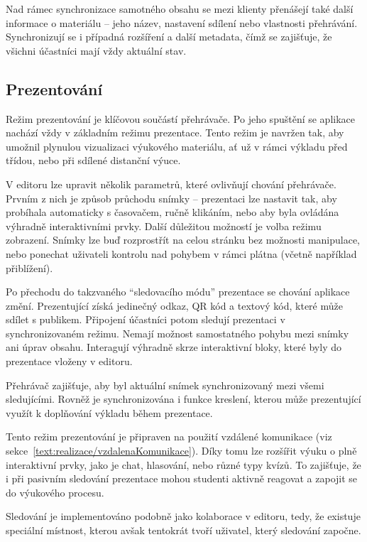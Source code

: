 Nad rámec synchronizace samotného obsahu se mezi klienty přenášejí také další informace o materiálu -- jeho název, nastavení sdílení nebo vlastnosti přehrávání.
Synchronizují se i případná rozšíření a další metadata, čímž se zajišťuje, že všichni účastníci mají vždy aktuální stav.

\subsection{Prezentování}


Režim prezentování je klíčovou součástí přehrávače. 
Po jeho spuštění se aplikace nachází vždy v základním režimu prezentace. 
Tento režim je navržen tak, aby umožnil plynulou vizualizaci výukového materiálu, ať už v rámci výkladu před třídou, nebo při sdílené distanční výuce.

V editoru lze upravit několik parametrů, které ovlivňují chování přehrávače.
Prvním z nich je způsob průchodu snímky -- prezentaci lze nastavit tak, aby probíhala automaticky s časovačem, ručně klikáním, nebo aby byla ovládána výhradně interaktivními prvky.
Další důležitou možností je volba režimu zobrazení.
Snímky lze buď rozprostřít na celou stránku bez možnosti manipulace, nebo ponechat uživateli kontrolu nad pohybem v rámci plátna (včetně například přiblížení).

Po přechodu do takzvaného \enquote{sledovacího módu} prezentace se chování aplikace změní. 
Prezentující získá jedinečný odkaz, QR kód a textový kód, které může sdílet s publikem. 
Připojení účastníci potom sledují prezentaci v synchronizovaném režimu. 
Nemají možnost samostatného pohybu mezi snímky ani úprav obsahu. 
Interagují výhradně skrze interaktivní bloky, které byly do prezentace vloženy v editoru.

Přehrávač zajišťuje, aby byl aktuální snímek synchronizovaný mezi všemi sledujícími.
Rovněž je synchronizována i funkce kreslení, kterou může prezentující využít k doplňování výkladu během prezentace.

Tento režim prezentování je připraven na použití vzdálené komunikace (viz sekce~\ref{text:realizace/vzdalenaKomunikace}).
Díky tomu lze rozšířit výuku o plně interaktivní prvky, jako je chat, hlasování, nebo různé typy kvízů. 
To zajišťuje, že i při pasivním sledování prezentace mohou studenti aktivně reagovat a zapojit se do výukového procesu.

Sledování je implementováno podobně jako kolaborace v editoru, tedy, že existuje speciální místnost, kterou avšak tentokrát tvoří uživatel, který sledování započne.

